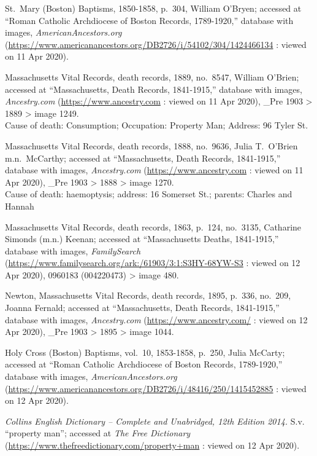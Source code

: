 \begin{thebibliography}{99}
	St.\ Mary (Boston) Baptisms, 1850-1858, p.\ 304, William O'Bryen; accessed at ``Roman Catholic Archdiocese of Boston Records, 1789-1920,'' database with images, \textit{AmericanAncestors.org} (\url{https://www.americanancestors.org/DB2726/i/54102/304/1424466134} : viewed on 11 Apr 2020).	
	
	Massachusetts Vital Records, death records, 1889, no.\ 8547, William O'Brien; accessed at ``Massachusetts, Death Records, 1841-1915,'' database with images, \textit{Ancestry.com} (\url{https://www.ancestry.com} : viewed on 11 Apr 2020), \_Pre 1903 > 1889 > image 1249.\\
	Cause of death: Consumption; Occupation: Property Man; Address: 96 Tyler St.
	
	Massachusetts Vital Records, death records, 1888, no.\ 9636, Julia T.\ O'Brien m.n.\ McCarthy; accessed at ``Massachusetts, Death Records, 1841-1915,'' database with images, \textit{Ancestry.com} (\url{https://www.ancestry.com} : viewed on 11 Apr 2020), \_Pre 1903 > 1888 > image 1270.\\
	Cause of death: haemoptysis; address: 16 Somerset St.; parents: Charles and Hannah
	
	Massachusetts Vital Records, death records, 1863, p.\ 124, no.\ 3135, Catharine Simonds (m.n.) Keenan; accessed at ``Massachusetts Deaths, 1841-1915,'' database with images, \textit{FamilySearch} (\url{https://www.familysearch.org/ark:/61903/3:1:S3HY-68YW-S3} : viewed on 12 Apr 2020), 0960183 (004220473) > image 480.
	
	Newton, Massachusetts Vital Records, death records, 1895, p.\ 336, no.\ 209, Joanna Fernald; accessed at ``Massachusetts, Death Records, 1841-1915,'' database with images, \textit{Ancestry.com} (\url{https://www.ancestry.com/} : viewed on 12 Apr 2020), \_Pre 1903 > 1895 > image 1044.
	
	Holy Cross (Boston) Baptisms, vol.\ 10, 1853-1858, p.\ 250, Julia McCarty; accessed at ``Roman Catholic Archdiocese of Boston Records, 1789-1920,'' database with images, \textit{AmericanAncestors.org} (\url{https://www.americanancestors.org/DB2726/i/48416/250/1415452885} : viewed on 12 Apr 2020).	
	
	\textit{Collins English Dictionary -- Complete and Unabridged, 12th Edition 2014.} S.v. ``property man''; accessed at \textit{The Free Dictionary} (\url{https://www.thefreedictionary.com/property+man} : viewed on 12 Apr 2020).
	

\end{thebibliography}
